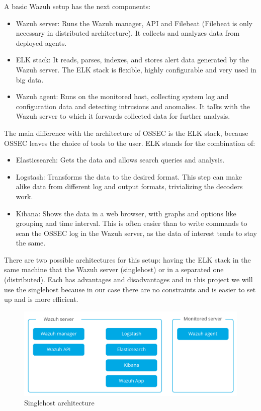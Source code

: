 A basic Wazuh setup has the next components\cite{wazuh_architecture}:
\begin{itemize}
	\item Wazuh server: Runs the Wazuh manager, API and Filebeat (Filebeat is only necessary in distributed architecture). It collects and analyzes data from deployed agents.
	\item ELK stack: It reads, parses, indexes, and stores alert data generated by the Wazuh server. The ELK stack is flexible, highly configurable and very used in big data.
	\item Wazuh agent: Runs on the monitored host, collecting system log and configuration data and detecting intrusions and anomalies. It talks with the Wazuh server to which it forwards collected data for further analysis.
\end{itemize}
\linej
The main difference with the architecture of OSSEC is the ELK stack, because OSSEC leaves the choice of tools to the user. ELK stands for the combination of:
\begin{itemize}
	\item Elasticsearch: Gets the data and allows search queries and analysis.
	\item Logstash: Transforms the data to the desired format. This step can make alike data from different log and output formats, trivializing the decoders work.
	\item Kibana: Shows the data in a web browser, with graphs and options like grouping and time interval. This is often easier than to write commands to scan the OSSEC log in the Wazuh server, as the data of interest tends to stay the same.
\end{itemize}
\linej
There are two possible architectures for this setup: having the ELK stack in the same machine that the Wazuh server (singlehost) or in a separated one (distributed). Each has advantages and disadvantages and in this project we will use the singlehost because in our case there are no constraints and is easier to set up and is more efficient.
\begin{figure}[H]
  \centering
	\includegraphics[width=\textwidth]{figuras/wazuh_singlehost.png}
	\caption{Singlehost architecture}
\end{figure}

